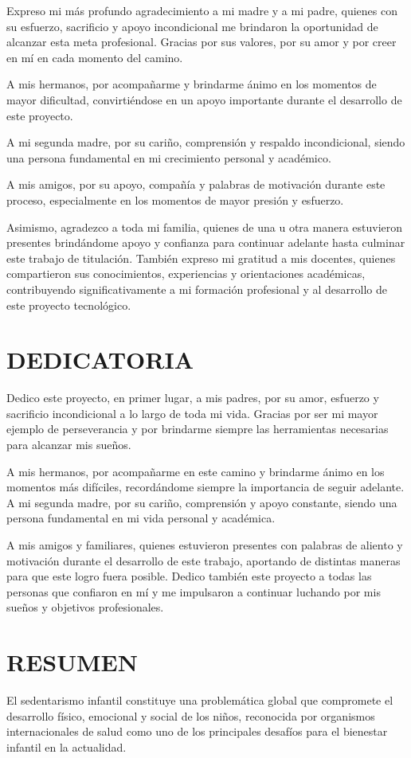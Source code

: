 \documentclass[12pt,a4paper,oneside]{report}
\begin{document}
		Expreso mi más profundo agradecimiento a mi madre y a mi padre, quienes con su esfuerzo, sacrificio y apoyo incondicional me brindaron la oportunidad de alcanzar esta meta profesional. Gracias por sus valores, por su amor y por creer en mí en cada momento del camino.
		
		A mis hermanos, por acompañarme y brindarme ánimo en los momentos de mayor dificultad, convirtiéndose en un apoyo importante durante el desarrollo de este proyecto.
		
		A mi segunda madre, por su cariño, comprensión y respaldo incondicional, siendo una persona fundamental en mi crecimiento personal y académico.
		
		A mis amigos, por su apoyo, compañía y palabras de motivación durante este proceso, especialmente en los momentos de mayor presión y esfuerzo.
		
		Asimismo, agradezco a toda mi familia, quienes de una u otra manera estuvieron presentes brindándome apoyo y confianza para continuar adelante hasta culminar este trabajo de titulación. También expreso mi gratitud a mis docentes, quienes compartieron sus conocimientos, experiencias y orientaciones académicas, contribuyendo significativamente a mi formación profesional y al desarrollo de este proyecto tecnológico.
		\clearpage
		
	\chapter*{DEDICATORIA}
		Dedico este proyecto, en primer lugar, a mis padres, por su amor, esfuerzo y sacrificio incondicional a lo largo de toda mi vida. Gracias por ser mi mayor ejemplo de perseverancia y por brindarme siempre las herramientas necesarias para alcanzar mis sueños.
		
		A mis hermanos, por acompañarme en este camino y brindarme ánimo en los momentos más difíciles, recordándome siempre la importancia de seguir adelante. A mi segunda madre, por su cariño, comprensión y apoyo constante, siendo una persona fundamental en mi vida personal y académica.
		
		A mis amigos y familiares, quienes estuvieron presentes con palabras de aliento y motivación durante el desarrollo de este trabajo, aportando de distintas maneras para que este logro fuera posible. Dedico también este proyecto a todas las personas que confiaron en mí y me impulsaron a continuar luchando por mis sueños y objetivos profesionales.
		\clearpage
		
	\chapter*{RESUMEN}
		El sedentarismo infantil constituye una problemática global que compromete el desarrollo físico, emocional y social de los niños, reconocida por organismos internacionales de salud como uno de los principales desafíos para el bienestar infantil en la actualidad.
		
\end{document}
